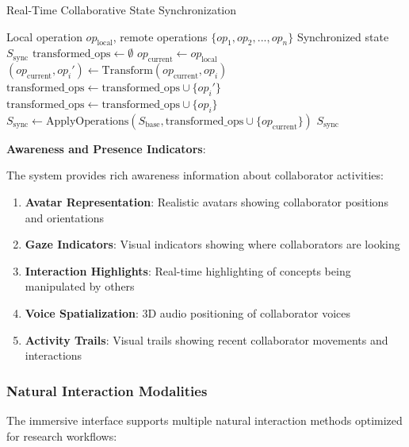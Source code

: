 \documentclass[10pt,twocolumn]{article}
\begin{document}
\begin{algorithm}[H]
\caption{Real-Time Collaborative State Synchronization}
\label{alg:collab_sync}
\begin{algorithmic}[1]
\REQUIRE Local operation $op_{\text{local}}$, remote operations $\{op_1, op_2, ..., op_n\}$
\ENSURE Synchronized state $S_{\text{sync}}$
\STATE $\text{transformed\_ops} \leftarrow \emptyset$
\STATE $op_{\text{current}} \leftarrow op_{\text{local}}$
        \STATE $(op_{\text{current}}, op_i') \leftarrow \text{Transform}(op_{\text{current}}, op_i)$
        \STATE $\text{transformed\_ops} \leftarrow \text{transformed\_ops} \cup \{op_i'\}$
    \ELSE
        \STATE $\text{transformed\_ops} \leftarrow \text{transformed\_ops} \cup \{op_i\}$
    \ENDIF
\ENDFOR
\STATE $S_{\text{sync}} \leftarrow \text{ApplyOperations}(S_{\text{base}}, \text{transformed\_ops} \cup \{op_{\text{current}}\})$
\RETURN $S_{\text{sync}}$
\end{algorithmic}
\end{algorithm}

\textbf{Awareness and Presence Indicators}:

The system provides rich awareness information about collaborator activities:

\begin{enumerate}
    \item \textbf{Avatar Representation}: Realistic avatars showing collaborator positions and orientations
    \item \textbf{Gaze Indicators}: Visual indicators showing where collaborators are looking
    \item \textbf{Interaction Highlights}: Real-time highlighting of concepts being manipulated by others
    \item \textbf{Voice Spatialization}: 3D audio positioning of collaborator voices
    \item \textbf{Activity Trails}: Visual trails showing recent collaborator movements and interactions
\end{enumerate}

\subsubsection{Natural Interaction Modalities}

The immersive interface supports multiple natural interaction methods optimized for research workflows:
\end{document}

